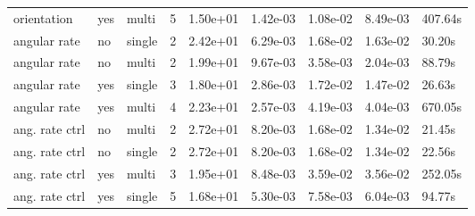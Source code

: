 \begin{table}
\begin{tabular}{p{21mm}p{9mm}p{12mm}p{6mm}p{14mm}p{14mm}p{14mm}p{14mm}p{14mm}}
orientation & yes & multi & 5 & \cellcolor{color10} 1.50e+01 & \cellcolor{color3} 1.42e-03 & 1.08e-02 & 8.49e-03 & 407.64s \\
angular rate & no & single & \cellcolor{color3} 2 & 2.42e+01 & 6.29e-03 & 1.68e-02 & 1.63e-02 & 30.20s \\
angular rate & no & multi & \cellcolor{color3} 2 & 1.99e+01 & \cellcolor{color9} 9.67e-03 & \cellcolor{color3} 3.58e-03 & \cellcolor{color3} 2.04e-03 & 88.79s \\
angular rate & yes & single & 3 & 1.80e+01 & 2.86e-03 & 1.72e-02 & 1.47e-02 & 26.63s \\
angular rate & yes & multi & 4 & 2.23e+01 & \cellcolor{color10} 2.57e-03 & \cellcolor{color10} 4.19e-03 & \cellcolor{color10} 4.04e-03 & \cellcolor{color9} 670.05s \\
ang. rate ctrl & no & multi & \cellcolor{color3} 2 & \cellcolor{color9} 2.72e+01 & 8.20e-03 & 1.68e-02 & 1.34e-02 & \cellcolor{color10} 21.45s \\
ang. rate ctrl & no & single & \cellcolor{color3} 2 & \cellcolor{color9} 2.72e+01 & 8.20e-03 & 1.68e-02 & 1.34e-02 & \cellcolor{color10} 22.56s \\
ang. rate ctrl & yes & multi & 3 & 1.95e+01 & 8.48e-03 & \cellcolor{color9} 3.59e-02 & \cellcolor{color9} 3.56e-02 & 252.05s \\
ang. rate ctrl & yes & single & 5 & 1.68e+01 & 5.30e-03 & 7.58e-03 & 6.04e-03 & 94.77s \\
\bottomrule
\end{tabular}
\end{table}
